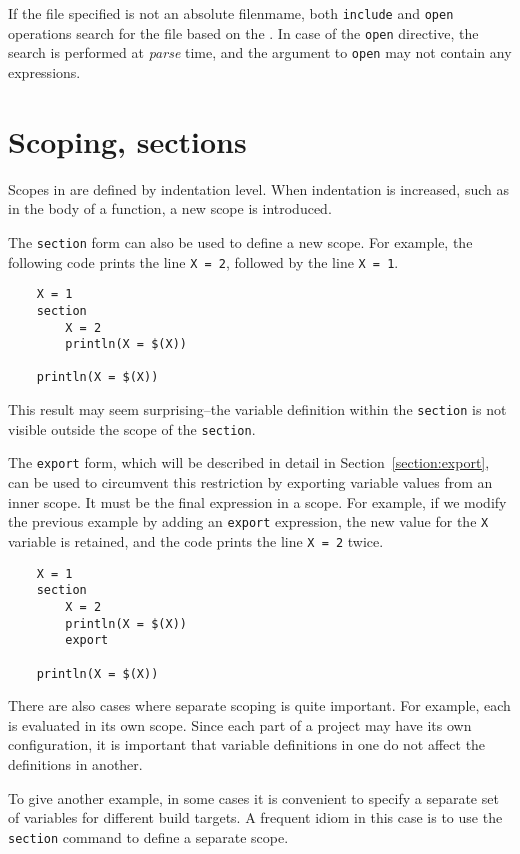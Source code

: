 If the file specified is not an absolute filenmame, both \verb+include+ and
\verb+open+ operations search for the file based on the
. In case of the \verb+open+ directive, the search is
performed at \emph{parse} time, and the argument to \verb+open+ may not
contain any expressions.

\section{Scoping, sections}
\label{section:section}

Scopes in  are defined by indentation level.  When indentation is
increased, such as in the body of a function, a new scope is introduced.

The \verb+section+ form can also be used to define a new scope.  For example, the following code
prints the line \verb+X = 2+, followed by the line \verb+X = 1+.

\begin{verbatim}
    X = 1
    section
        X = 2
        println(X = $(X))

    println(X = $(X))
\end{verbatim}

This result may seem surprising--the variable definition within the
\verb+section+ is not visible outside the scope of the \verb+section+.

The \verb+export+ form, which will be described in detail in
Section~\ref{section:export}, can be used to circumvent this restriction by
exporting variable values from an inner scope.  It must be the final
expression in a scope.  For example, if we modify the previous example
by adding an \verb+export+ expression, the new value for the \verb+X+
variable is retained, and the code prints the line \verb+X = 2+ twice.

\begin{verbatim}
    X = 1
    section
        X = 2
        println(X = $(X))
        export

    println(X = $(X))
\end{verbatim}

There are also cases where separate scoping is quite important.  For example,
each  is evaluated in its own scope.  Since each part of a project
may have its own configuration, it is important that variable definitions in one
 do not affect the definitions in another.

To give another example, in some cases it is convenient to specify a
separate set of variables for different build targets.  A frequent
idiom in this case is to use the \verb+section+ command to define a
separate scope.

